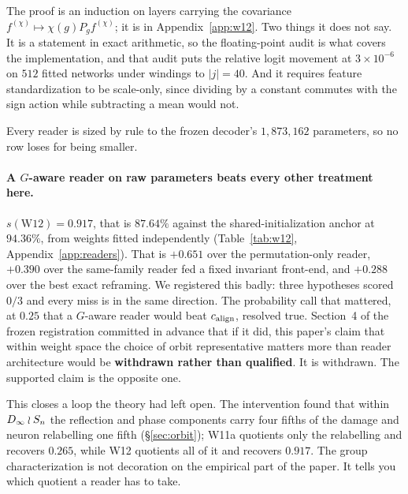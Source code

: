 The proof is an induction on layers carrying the covariance
$f^{(\chi)} \mapsto \chi(g) P_g f^{(\chi)}$; it is in Appendix~\ref{app:w12}. Two things it does not
say. It is a statement in exact arithmetic, so the floating-point audit is what covers the
implementation, and that audit puts the relative logit movement at $3\times10^{-6}$ on $512$ fitted
networks under windings to $|j| = 40$. And it requires feature standardization to be scale-only,
since dividing by a constant commutes with the sign action while subtracting a mean would not.

Every reader is sized by rule to the frozen decoder's $1{,}873{,}162$ parameters, so no row loses
for being smaller.

\paragraph{A $G$-aware reader on raw parameters beats every other treatment here.}
$s(\mathrm{W12}) = \mathbf{0.917}$, that is $87.64\%$ against the shared-initialization anchor at
$94.36\%$, from weights fitted independently (Table~\ref{tab:w12}, Appendix~\ref{app:readers}). That is $+0.651$ over the permutation-only reader,
$+0.390$ over the same-family reader fed a fixed invariant front-end, and $+0.288$ over the best
exact reframing. We registered this badly: three hypotheses scored $0/3$ and every miss is in the
same direction. The probability call that mattered, at $0.25$ that a $G$-aware reader would beat
$c_{\mathrm{align}}$, resolved true. Section~4 of the frozen registration committed in advance that if it did,
this paper's claim that within weight space the choice of orbit representative matters more than
reader architecture would be \textbf{withdrawn rather than qualified}. It is withdrawn. The
supported claim is the opposite one.

This closes a loop the theory had left open. The intervention found that within $D_\infty\wr S_n$ the
reflection and phase components carry four fifths of the damage and neuron relabelling one fifth
(\S\ref{sec:orbit}); W11a quotients only the relabelling and recovers $0.265$, while W12 quotients
all of it and recovers $0.917$. The group characterization is not decoration on the empirical part
of the paper. It tells you which quotient a reader has to take.

